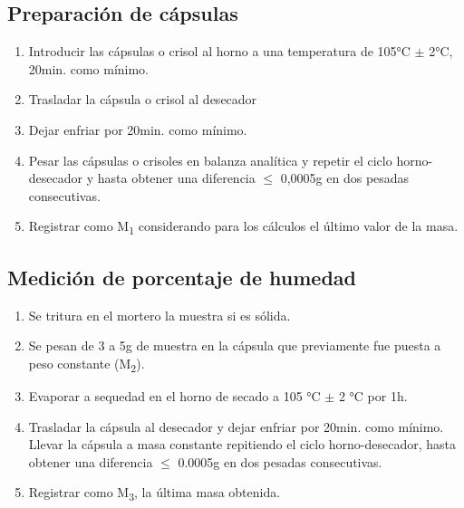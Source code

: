 \subsection{Preparación de cápsulas}
\begin{enumerate}
    \item Introducir las cápsulas o crisol al horno a una temperatura de 105°C $\pm$ 2°C, 20min. como mínimo. 
    \item Trasladar la cápsula o crisol al desecador
    \item Dejar enfriar por 20min. como mínimo.
    \item Pesar las cápsulas o crisoles en balanza analítica y repetir el ciclo horno-desecador y hasta obtener una diferencia $\leq$ 0,0005g en dos pesadas consecutivas. 
    \item Registrar como M\textsubscript{1} considerando para los cálculos el último valor de la masa.
\end{enumerate}

\subsection{Medición de porcentaje de humedad}
\begin{enumerate}
    \item Se tritura en el mortero la muestra si es sólida.
    \item Se pesan de 3 a 5g de muestra en la cápsula que previamente fue puesta a peso constante (M\textsubscript{2}).
    \item Evaporar a sequedad en el horno de secado a 105 °C $\pm$ 2 °C por 1h.
    \item Trasladar la cápsula al desecador y dejar enfriar por 20min. como mínimo. Llevar la cápsula a masa constante repitiendo el ciclo horno-desecador, hasta obtener una diferencia $\leq$ 0.0005g en dos pesadas consecutivas.
    \item Registrar como M\textsubscript{3}, la última masa obtenida.
\end{enumerate}

